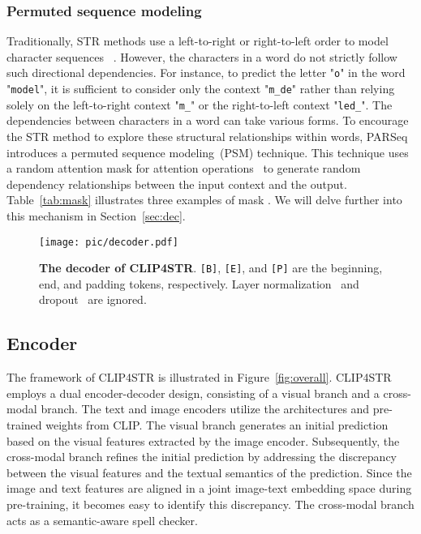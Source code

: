 \documentclass[lettersize,journal]{IEEEtran}
\begin{document}
\subsubsection{Permuted sequence modeling} \label{sec-psm}
Traditionally, STR methods use a left-to-right or right-to-left order to model character sequences ~\cite{2021_abinet}. 
However, the characters in a word do not strictly follow such directional dependencies.
For instance, to predict the letter "\texttt{o}" in the word "\texttt{model}", it is sufficient to consider only the context "\texttt{m\_de}" rather than relying solely on the left-to-right context "\texttt{m\_}" or the right-to-left context "\texttt{led\_}". 
The dependencies between characters in a word can take various forms.
To encourage the STR method to explore these structural relationships within words, PARSeq~\cite{2022_parseq} introduces a permuted sequence modeling~(PSM) technique.
This technique uses a random attention mask  for attention operations~\cite{2017_attention} to generate random dependency relationships between the input context and the output. 
Table~\ref{tab:mask} illustrates three examples of mask .
We will delve further into this mechanism in Section~\ref{sec:dec}.

\begin{figure*}[!t]
	\centering
	\texttt{[image: pic/decoder.pdf]}
	\caption{\textbf{The decoder of CLIP4STR}. \texttt{[B]}, \texttt{[E]}, and \texttt{[P]} are the beginning, end, and padding tokens, respectively.
 Layer normalization~\cite{2016_ln}
 and dropout~\cite{2014_dropout} are ignored.}
	\label{fig:decoder}
\end{figure*}


\subsection{Encoder}
The framework of CLIP4STR is illustrated in Figure~\ref{fig:overall}.
CLIP4STR employs a dual encoder-decoder design, consisting of a visual branch and a cross-modal branch.
The text and image encoders utilize the architectures and pre-trained weights from CLIP.
The visual branch generates an initial prediction based on the visual features extracted by the image encoder.
Subsequently, the cross-modal branch refines the initial prediction by addressing the discrepancy between the visual features and the textual semantics of the prediction.
Since the image and text features are aligned in a joint image-text embedding space during pre-training, it becomes easy to identify this discrepancy.
The cross-modal branch acts as a semantic-aware spell checker.
\end{document}
